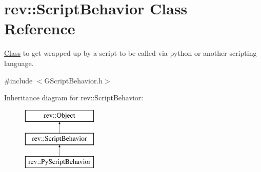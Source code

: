 \hypertarget{classrev_1_1_script_behavior}{}\section{rev\+::Script\+Behavior Class Reference}
\label{classrev_1_1_script_behavior}


\mbox{\hyperlink{struct_class}{Class}} to get wrapped up by a script to be called via python or another scripting language.  




{\ttfamily \#include $<$G\+Script\+Behavior.\+h$>$}

Inheritance diagram for rev\+::Script\+Behavior\+:\begin{figure}[H]
\begin{center}
\leavevmode
\includegraphics[height=3.000000cm]{classrev_1_1_script_behavior}
\end{center}
\end{figure}
